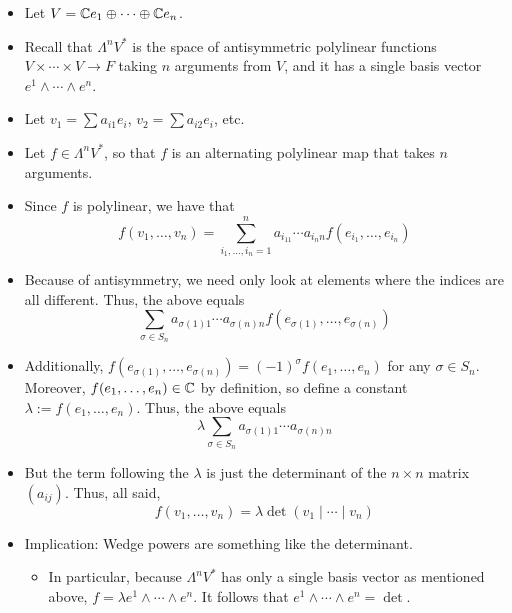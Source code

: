 \documentclass[../notes.tex]{subfiles}
\begin{document}
\begin{itemize}
    \begin{itemize}
        \item Let $V=\mathbb{C} e_1\oplus\cdots\oplus\mathbb{C} e_n$.
        \item Recall that $\Lambda^nV^*$ is the space of antisymmetric polylinear functions $V\times\cdots\times V\to F$ taking $n$ arguments from $V$, and it has a single basis vector $e^1\wedge\cdots\wedge e^n$.
        \item Let $v_1=\sum a_{i1}e_i$, $v_2=\sum a_{i2}e_i$, etc.
        \item Let $f\in\Lambda^nV^*$, so that $f$ is an alternating polylinear map that takes $n$ arguments.
        \item Since $f$ is polylinear, we have that
        \begin{equation*}
            f(v_1,\dots,v_n) = \sum_{i_1,\dots,i_n=1}^na_{i_11}\cdots a_{i_nn}f(e_{i_1},\dots,e_{i_n})
        \end{equation*}
        \item Because of antisymmetry, we need only look at elements where the indices are all different. Thus, the above equals
        \begin{equation*}
            \sum_{\sigma\in S_n}a_{\sigma(1)1}\cdots a_{\sigma(n)n}f(e_{\sigma(1)},\dots,e_{\sigma(n)})
        \end{equation*}
        \item Additionally, $f(e_{\sigma(1)},\dots,e_{\sigma(n)})=(-1)^\sigma f(e_1,\dots,e_n)$ for any $\sigma\in S_n$. Moreover, $f(e_1,\dots,e_n)\in\mathbb{C}$ by definition, so define a constant $\lambda:=f(e_1,\dots,e_n)$. Thus, the above equals
        \begin{equation*}
            \lambda\sum_{\sigma\in S_n}a_{\sigma(1)1}\cdots a_{\sigma(n)n}
        \end{equation*}
        \item But the term following the $\lambda$ is just the determinant of the $n\times n$ matrix $(a_{ij})$. Thus, all said,
        \begin{equation*}
            f(v_1,\dots,v_n) = \lambda\det(v_1\mid\cdots\mid v_n)
        \end{equation*}
        \item Implication: Wedge powers are something like the determinant.
        \begin{itemize}
            \item In particular, because $\Lambda^nV^*$ has only a single basis vector as mentioned above, $f=\lambda e^1\wedge\cdots\wedge e^n$. It follows that $e^1\wedge\cdots\wedge e^n=\det$.

\end{itemize}
\end{itemize}
\end{itemize}
\end{document}
